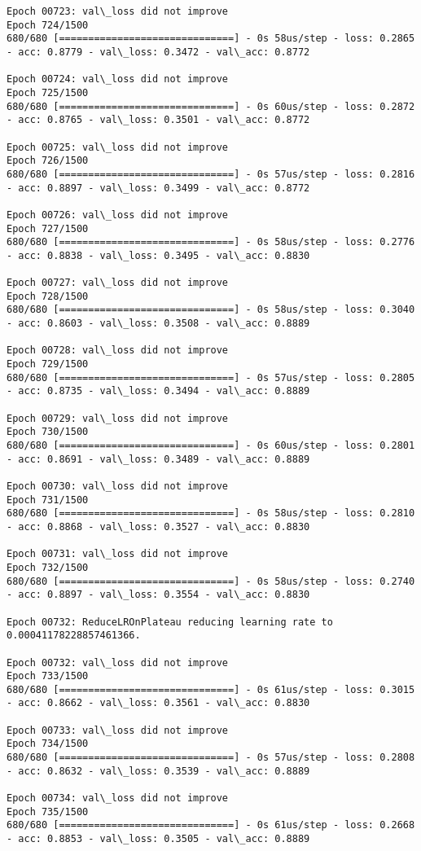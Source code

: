 \documentclass[11pt]{article}
\begin{document}
\begin{Verbatim}[commandchars=\\\{\}]
Epoch 00723: val\_loss did not improve
Epoch 724/1500
680/680 [==============================] - 0s 58us/step - loss: 0.2865 - acc: 0.8779 - val\_loss: 0.3472 - val\_acc: 0.8772

Epoch 00724: val\_loss did not improve
Epoch 725/1500
680/680 [==============================] - 0s 60us/step - loss: 0.2872 - acc: 0.8765 - val\_loss: 0.3501 - val\_acc: 0.8772

Epoch 00725: val\_loss did not improve
Epoch 726/1500
680/680 [==============================] - 0s 57us/step - loss: 0.2816 - acc: 0.8897 - val\_loss: 0.3499 - val\_acc: 0.8772

Epoch 00726: val\_loss did not improve
Epoch 727/1500
680/680 [==============================] - 0s 58us/step - loss: 0.2776 - acc: 0.8838 - val\_loss: 0.3495 - val\_acc: 0.8830

Epoch 00727: val\_loss did not improve
Epoch 728/1500
680/680 [==============================] - 0s 58us/step - loss: 0.3040 - acc: 0.8603 - val\_loss: 0.3508 - val\_acc: 0.8889

Epoch 00728: val\_loss did not improve
Epoch 729/1500
680/680 [==============================] - 0s 57us/step - loss: 0.2805 - acc: 0.8735 - val\_loss: 0.3494 - val\_acc: 0.8889

Epoch 00729: val\_loss did not improve
Epoch 730/1500
680/680 [==============================] - 0s 60us/step - loss: 0.2801 - acc: 0.8691 - val\_loss: 0.3489 - val\_acc: 0.8889

Epoch 00730: val\_loss did not improve
Epoch 731/1500
680/680 [==============================] - 0s 58us/step - loss: 0.2810 - acc: 0.8868 - val\_loss: 0.3527 - val\_acc: 0.8830

Epoch 00731: val\_loss did not improve
Epoch 732/1500
680/680 [==============================] - 0s 58us/step - loss: 0.2740 - acc: 0.8897 - val\_loss: 0.3554 - val\_acc: 0.8830

Epoch 00732: ReduceLROnPlateau reducing learning rate to 0.00041178228857461366.

Epoch 00732: val\_loss did not improve
Epoch 733/1500
680/680 [==============================] - 0s 61us/step - loss: 0.3015 - acc: 0.8662 - val\_loss: 0.3561 - val\_acc: 0.8830

Epoch 00733: val\_loss did not improve
Epoch 734/1500
680/680 [==============================] - 0s 57us/step - loss: 0.2808 - acc: 0.8632 - val\_loss: 0.3539 - val\_acc: 0.8889

Epoch 00734: val\_loss did not improve
Epoch 735/1500
680/680 [==============================] - 0s 61us/step - loss: 0.2668 - acc: 0.8853 - val\_loss: 0.3505 - val\_acc: 0.8889


\end{Verbatim}
\end{document}
